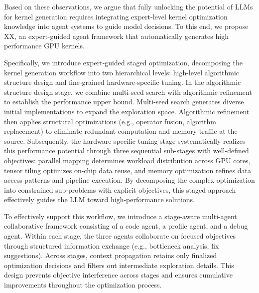 \documentclass{article}
\theoremstyle{plain}
\theoremstyle{definition}
\theoremstyle{remark}
\begin{document}
Based on these observations, we argue that fully unlocking the potential of LLMs for kernel generation requires integrating expert-level kernel optimization knowledge into agent systems to guide model decisions. To this end, we propose XX, an expert-guided agent framework that automatically generates high performance GPU kernels.

Specifically, we introduce expert-guided staged optimization, decomposing the kernel generation workflow into two hierarchical levels: high-level algorithmic structure design and fine-grained hardware-specific tuning. In the algorithmic structure design stage, we combine multi-seed search with algorithmic refinement to establish the performance upper bound. Multi-seed search generates diverse initial implementations to expand the exploration space. Algorithmic refinement then applies structural optimizations (e.g., operator fusion, algorithm replacement) to eliminate redundant computation and memory traffic at the source.
Subsequently, the hardware-specific tuning stage systematically realizes this performance potential through three sequential sub-stages with well-defined objectives: parallel mapping determines workload distribution across GPU cores, tensor tiling optimizes on-chip data reuse, and memory optimization refines data access patterns and pipeline execution. By decomposing the complex optimization into constrained sub-problems with explicit objectives, this staged approach effectively guides the LLM toward high-performance solutions.

To effectively support this workflow, we introduce a stage-aware multi-agent collaborative framework consisting of a code agent, a profile agent, and a debug agent. Within each stage, the three agents collaborate on focused objectives through structured information exchange (e.g., bottleneck analysis, fix suggestions). Across stages, context propagation retains only finalized optimization decisions and filters out intermediate exploration details. This design prevents objective interference across stages and ensures cumulative improvements throughout the optimization process.
\end{document}
